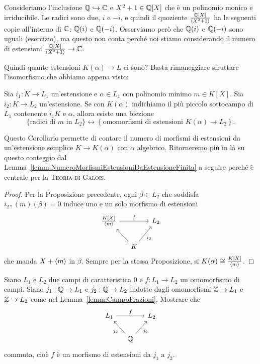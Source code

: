 \begin{esem}
Consideriamo l'inclusione \(\mathbb{Q} \hookrightarrow \mathbb{C}\) e \(X^2+1 \in \mathbb{Q}[X]\) che è un polinomio monico e irriducibile. Le radici sono due, \(i\) e \(-i\), e quindi il quoziente \(\frac{\mathbb{Q}[X]}{\left\langle X^2+1\right\rangle}\) ha le seguenti copie all'interno di \(\mathbb{C}\): \(\mathbb{Q}(i)\) e \(\mathbb{Q}(-i)\). Osserviamo però che \(\mathbb{Q}(i)\) e \(\mathbb{Q}(-i)\) sono uguali (esercizio), ma questo non conta perché noi stiamo considerando il numero di estensioni \(\frac{\mathbb{Q}[X]}{\left\langle X^2+1\right\rangle} \to \mathbb{C}\).
\end{esem}

Quindi quante estensioni \(K(\alpha) \to L\) ci sono? Basta rimaneggiare sfruttare l'isomorfismo che abbiamo appena visto:

\begin{coro}\label{coro:NumeroMorfismiEstensioniDaKAlgebrico}
Sia \(i_1 : K \to L_1\) un'estensione e \(\alpha \in L_1\) con polinomio minimo \(m \in K[X]\). Sia \(i_2  : K \to L_2\) un'estensione. Se con \(K(\alpha)\) indichiamo il più piccolo sottocampo di \(L_1\) contenente \(i_1 K\) e \(\alpha\), allora esiste una biezione
\[\{\text{radici di } m \text{ in } L_2\} \leftrightarrow \left\{\text{omomorfismi di estensioni } K(\alpha) \to L_2\right\} .\]
\end{coro}

Questo Corollario permette di contare il numero di morfismi di estensioni da un'estensione semplice \(K \to K(\alpha)\) con \(\alpha\) algebrico. Ritorneremo più in là su questo conteggio dal Lemma~\ref{lemm:NumeroMorfismiEstensioniDaEstensioneFinita} a seguire perché è centrale per la {\scshape Teoria di Galois}.

\begin{proof}
Per la Proposizione precedente, ogni \(\beta \in L_2\) che soddisfa \(i_{2\ast} (m) (\beta) = 0\) induce uno e un solo morfismo di estensioni
\[\begin{tikzcd}[column sep=small]
\frac{K[X]}{\gen m} \ar["f", rr] & & L_2 \\
& K \ar[hookrightarrow, ul] \ar["{i_2}", ur, swap]
\end{tikzcd}\]
che manda \(X + \left\langle m\right\rangle\) in \(\beta\). Sempre per la stessa Proposizione, si \(K(\alpha) \cong \frac{K[X]}{\left\langle m\right\rangle}\).
\end{proof}

\begin{eser}
Siano \(L_1\) e \(L_2\) due campi di caratteristica \(0\) e \(f : L_1 \to L_2\) un omomorfismo di campi. Siano \(j_1 : \mathbb{Q} \to L_1\) e \(j_2 : \mathbb{Q} \to L_2\) indotte dagli omomorfismi \(\mathbb{Z} \to L_1\) e \(\mathbb{Z} \to L_2\) come nel Lemma~\ref{lemm:CampoFrazioni}. Mostrare che
\[\begin{tikzcd}[column sep=small]
L_1 \ar["f", rr] & & L_2 \\
& \Q \ar["{j_2}", ul] \ar["{j_2}", ur, swap]
\end{tikzcd}\]
commuta, cioè \(f\) è un morfismo di estensioni da \(j_1\) a \(j_2\).
\end{eser}

